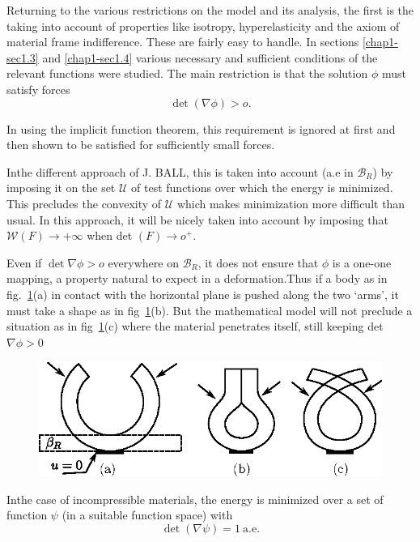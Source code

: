Returning to the various restrictions on the model and its analysis,
the first is the taking into account of properties like isotropy,
hyperelasticity and the axiom of material frame indifference. These
are fairly easy to handle. In sections \ref{chap1-sec1.3} and
\ref{chap1-sec1.4}  various
necessary and sufficient conditions of the relevant functions were
studied. The main restriction is that the solution $\phi$ must satisfy
forces 
$$
\det (\nabla \phi) > o.
$$

In using the implicit function theorem, this requirement is ignored at
first and then shown to be satisfied for sufficiently small forces. 

In\pageoriginale the different approach of J. BALL, this is taken into
account (a.e 
in $\mathcal{B}_R$) by imposing it on the set $\mathscr{U}$ of test
functions over which the energy is minimized. This precludes the
convexity of $\mathscr{U}$ which makes minimization more difficult
than usual. In this approach, it will be nicely taken into account by
imposing that $\mathcal{W} (F) \to + \infty$ when det $(F) \to o^+$.  
 
 Even if $\det \nabla \phi > o$ everywhere on
 $\mathcal{B}_R$, it does not ensure that $\phi$ is a one-one mapping,
 a property natural to expect in a deformation.Thus if a body as in
 fig.~\ref{fig2.1.8}(a) in contact with the horizontal plane is pushed along
 the two `arms', it must take a shape as in fig~\ref{fig2.1.8}(b). But the
 mathematical model will not preclude a situation as in fig~\ref{fig2.1.8}(c)
 where the material penetrates itself, still keeping det
 $\nabla \phi > 0$ 

\begin{figure}[H]
\centering
\includegraphics{vol71-figures/fig2.1-8.eps}
\medskip
\caption{}\label{fig2.1.8}
\end{figure}

In\pageoriginale the case of incompressible materials, the energy is
minimized over 
a set of function $\psi$ (in a suitable function space) with 
$$
\det (\nabla \psi) =1 ~\text{a.e}.
$$

